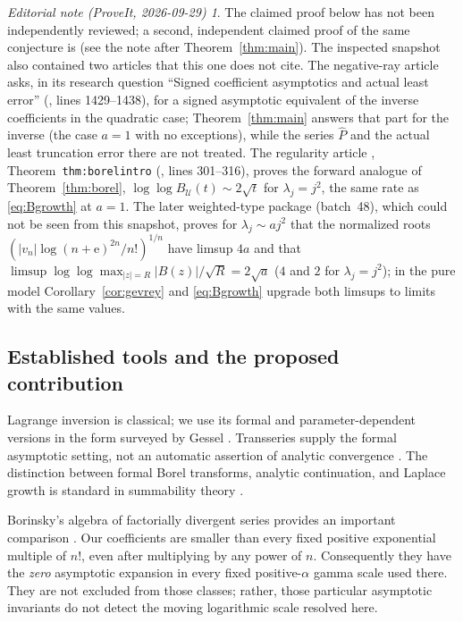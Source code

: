 \documentclass[11pt,a4paper]{article}
\numberwithin{equation}{section}
\theoremstyle{definition}
\theoremstyle{remark}\newtheorem{remark}[theorem]{Remark}
\newtheorem*{ednote}{Editorial note (ProveIt, 2026-09-29)}
\newcommand{\ee}{\mathrm e}\newcommand{\dd}{\mathrm d}
\begin{document}
\begin{ednote}
The claimed proof below has not been independently reviewed; a second,
independent claimed proof of the same conjecture is \cite{ed:qef} (see the
note after Theorem~\ref{thm:main}). The inspected snapshot also contained
two articles that this one does not cite. The negative-ray article
\cite{ed:nrs} asks, in its research question ``Signed coefficient
asymptotics and actual least error''
(,
lines 1429--1438), for a signed asymptotic equivalent of the inverse
coefficients in the quadratic case; Theorem~\ref{thm:main} answers that
part for the inverse (the case $a=1$ with no exceptions), while the series
$\widehat P$ and the actual least truncation error there are not treated.
The regularity article \cite{ed:reg}, Theorem~\texttt{thm:borelintro}
(,
lines 301--316), proves the forward analogue of Theorem~\ref{thm:borel},
$\log\log B_{\mathcal U}(t)\sim2\sqrt t$ for $\lambda_j=j^2$, the same
rate as \eqref{eq:Bgrowth} at $a=1$. The later weighted-type package
\cite{ed:swt} (batch~48), which could not be seen from this snapshot,
proves for $\lambda_j\sim aj^2$ that the normalized roots
$(|v_n|\log(n+\ee)^{2n}/n!)^{1/n}$ have limsup $4a$ and that
$\limsup\log\log\max_{|z|=R}|B(z)|/\sqrt R=2\sqrt a$ ($4$ and $2$ for
$\lambda_j=j^2$); in the pure model Corollary~\ref{cor:gevrey} and
\eqref{eq:Bgrowth} upgrade both limsups to limits with the same values.
\end{ednote}

\subsection{Established tools and the proposed contribution}
Lagrange inversion is classical; we use its formal and parameter-dependent
versions in the form surveyed by Gessel \cite{gessel}. Transseries supply the
formal asymptotic setting, not an automatic assertion of analytic convergence
\cite{edgar}. The distinction between formal Borel transforms, analytic
continuation, and Laplace growth is standard in summability theory
\cite{sauzin}.

Borinsky's algebra of factorially divergent series provides an important
comparison \cite{borinsky}. Our coefficients are smaller than every fixed
positive exponential multiple of $n!$, even after multiplying by any power
of $n$. Consequently they have the \emph{zero} asymptotic expansion in every
fixed positive-$\alpha$ gamma scale used there. They are not excluded from
those classes; rather, those particular asymptotic invariants do not detect
the moving logarithmic scale resolved here.
\end{document}
